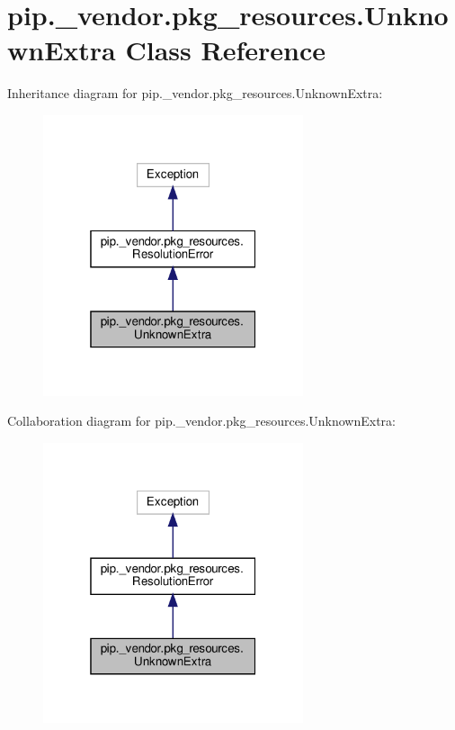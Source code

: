 \hypertarget{classpip_1_1__vendor_1_1pkg__resources_1_1UnknownExtra}{}\section{pip.\+\_\+vendor.\+pkg\+\_\+resources.\+Unknown\+Extra Class Reference}
\label{classpip_1_1__vendor_1_1pkg__resources_1_1UnknownExtra}


Inheritance diagram for pip.\+\_\+vendor.\+pkg\+\_\+resources.\+Unknown\+Extra\+:
\nopagebreak
\begin{figure}[H]
\begin{center}
\leavevmode
\includegraphics[width=217pt]{classpip_1_1__vendor_1_1pkg__resources_1_1UnknownExtra__inherit__graph}
\end{center}
\end{figure}


Collaboration diagram for pip.\+\_\+vendor.\+pkg\+\_\+resources.\+Unknown\+Extra\+:
\nopagebreak
\begin{figure}[H]
\begin{center}
\leavevmode
\includegraphics[width=217pt]{classpip_1_1__vendor_1_1pkg__resources_1_1UnknownExtra__coll__graph}
\end{center}
\end{figure}
